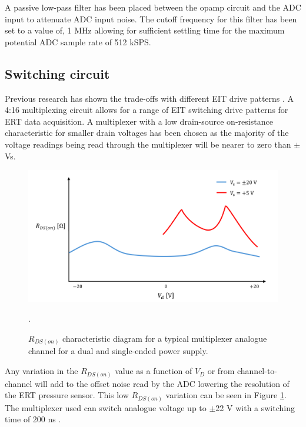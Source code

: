 A passive low-pass filter has been placed between the opamp circuit and the ADC input to attenuate ADC input noise. The cutoff frequency for this filter has been set to a value of, 1 MHz allowing for sufficient settling time for the maximum potential ADC sample rate of 512 kSPS.


\subsection{Switching circuit}
Previous research has shown the trade-offs with different EIT drive patterns \cite{Tawil2011, Russo2017, Xu2008}. A 4:16 multiplexing circuit allows for a range of EIT switching drive patterns for ERT data acquisition. A multiplexer with a low drain-source on-resistance characteristic for smaller drain voltages has been chosen as the majority of the voltage readings being read through the multiplexer will be nearer to zero than $\pm$Vs.
\begin{figure}[H]
\centering
\includegraphics[width=0.7\linewidth]{Figures/mux_r_on_example.png}
\caption{$R_{DS(on)}$ characteristic diagram for a typical multiplexer analogue channel for a dual and single-ended power supply.}\cite{Vishay2024}.
\label{fig:mux_r_on}
\end{figure}


Any variation in the $R_{DS(on)}$ value as a function of $V_D$ or from channel-to-channel will add to the offset noise read by the ADC lowering the resolution of the ERT pressure sensor. This low $R_{DS(on)}$ variation can be seen in Figure \ref{fig:mux_r_on}. The multiplexer used can switch analogue voltage up to $\pm$22 V with a switching time of 200 ns \cite{Vishay2024}.


